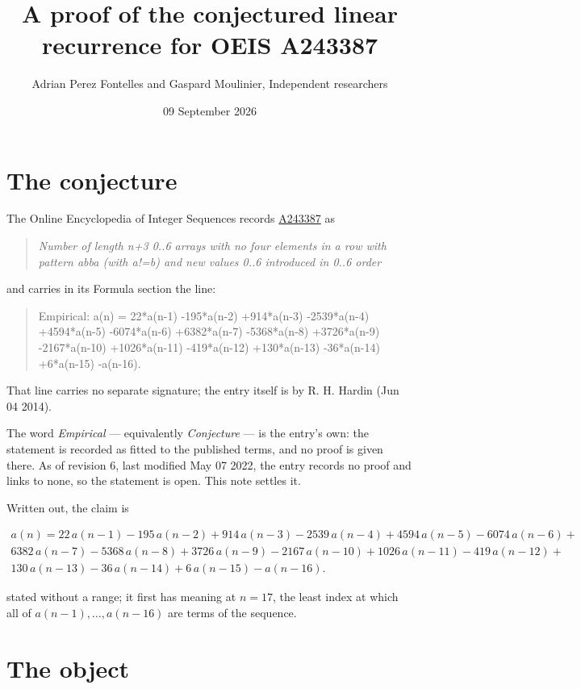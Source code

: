 \documentclass[11pt]{article}
\title{A proof of the conjectured linear recurrence for OEIS A243387}
\author{Adrian Perez Fontelles and Gaspard Moulinier, Independent researchers}
\date{09 September 2026}
\theoremstyle{definition}
\begin{document}
\maketitle
\section{The conjecture}

The Online Encyclopedia of Integer Sequences records \href{https://oeis.org/A243387}{A243387} as

\begin{quote}\itshape Number of length n+3 0..6 arrays with no four elements in a row with pattern abba (with a!=b) and new values 0..6 introduced in 0..6 order\end{quote}

and carries in its Formula section the line:

\begin{quote}\ttfamily Empirical: a(n) = 22*a(n-1) -195*a(n-2) +914*a(n-3) -2539*a(n-4) +4594*a(n-5) -6074*a(n-6) +6382*a(n-7) -5368*a(n-8) +3726*a(n-9) -2167*a(n-10) +1026*a(n-11) -419*a(n-12) +130*a(n-13) -36*a(n-14) +6*a(n-15) -a(n-16).\end{quote}

That line carries no separate signature; the entry itself is by R. H. Hardin (Jun 04 2014).

The word {\itshape Empirical} --- equivalently {\itshape Conjecture} --- is the entry's own: the statement is recorded as fitted to the published terms, and no proof is given there. As of revision 6, last modified May 07 2022, the entry records no proof and links to none, so the statement is open. This note settles it.

Written out, the claim is

\begin{multline*} a(n) = 22\,a(n-1) - 195\,a(n-2) + 914\,a(n-3) - 2539\,a(n-4) + 4594\,a(n-5) - 6074\,a(n-6) + \\ 6382\,a(n-7) - 5368\,a(n-8) + 3726\,a(n-9) - 2167\,a(n-10) + 1026\,a(n-11) - 419\,a(n-12) + \\ 130\,a(n-13) - 36\,a(n-14) + 6\,a(n-15) - a(n-16). \end{multline*}

stated without a range; it first has meaning at $n = 17$, the least index at which all of $a(n-1),\dots,a(n-16)$ are terms of the sequence.

\section{The object}
\end{document}

